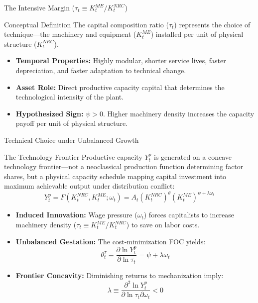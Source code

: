 \documentclass[10pt]{beamer}
\begin{document}
\begin{frame}{The Intensive Margin ($\tau_t \equiv K^{ME}_t / K^{NRC}_t$)}
  \begin{block}{Conceptual Definition}
    The capital composition ratio ($\tau_t$) represents the choice of technique—the machinery and equipment ($K^{ME}_t$) installed per unit of physical structure ($K^{NRC}_t$).
  \end{block}
  \begin{itemize}
    \item \textbf{Temporal Properties:} Highly modular, shorter service lives, faster depreciation, and faster adaptation to technical change.
    \item \textbf{Asset Role:} Direct productive capacity capital that determines the technological intensity of the plant.
    \item \textbf{Hypothesized Sign:} $\psi > 0$. Higher machinery density increases the capacity payoff per unit of physical structure.
  \end{itemize}
\end{frame}

\begin{frame}{Technical Choice under Unbalanced Growth}
  \begin{block}{The Technology Frontier}\small
    Productive capacity $Y^p_t$ is generated on a concave technology frontier---not a neoclassical production function determining factor shares, but a physical capacity schedule mapping capital investment into maximum achievable output under distribution conflict:\vspace{-0.3em}
    $$Y^p_t = F(K^{NRC}_t, K^{ME}_t; \omega_t) = A_t (K^{NRC}_t)^{\theta} (K^{ME}_t)^{\psi + \lambda \omega_t}$$
  \end{block}\vspace{-0.3em}
  \begin{itemize}\itemsep0.3em
    \item \textbf{Induced Innovation:} Wage pressure ($\omega_t$) forces capitalists to increase machinery density ($\tau_t \equiv K^{ME}_t / K^{NRC}_t$) to save on labor costs.
    \item \textbf{Unbalanced Gestation:} The cost-minimization FOC yields:\vspace{-0.3em}
      $$\theta^{\tau}_t \equiv \frac{\partial \ln Y^p_t}{\partial \ln \tau_t} = \psi + \lambda \omega_t$$\vspace{-0.6em}
    \item \textbf{Frontier Concavity:} Diminishing returns to mechanization imply:\vspace{-0.3em}
      $$\lambda \equiv \frac{\partial^2 \ln Y^p_t}{\partial \ln \tau_t \partial \omega_t} < 0$$
  \end{itemize}
\end{frame}
\end{document}
